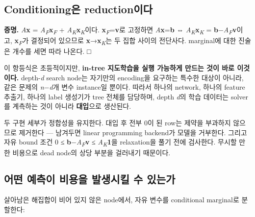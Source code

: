 \documentclass[final,5p,twocolumn]{elsarticle}
\begin{document}
\subsection{Conditioning은 reduction이다}
\noindent{}\par\medskip
\textbf{증명.} \textit{A}\textbf{x} = \textit{A\textsubscript{F}}\textbf{x}\textsubscript{\textit{F}} + \textit{A\textsubscript{K}}\textbf{x}\textsubscript{\textit{K}}이다. \textbf{x}\textsubscript{\textit{F}}=\textbf{v}로 고정하면 \textit{A}\textbf{x}=\textbf{b} ⇔ \textit{A\textsubscript{K}}\textbf{x}\textsubscript{\textit{K}} = \textbf{b}−\textit{A\textsubscript{F}}\textbf{v}이고, \textbf{x}\textsubscript{\textit{F}}가 결정되어 있으므로 \textbf{x}→\textbf{x}\textsubscript{\textit{K}}는 두 집합 사이의 전단사다. marginal에 대한 진술은 개수를 세면 따라 나온다. □

이 항등식은 초등적이지만, \textbf{in-tree 지도학습을 실행 가능하게 만드는 것이 바로 이것이다.} depth-\textit{d} search node는 자기만의 encoding을 요구하는 특수한 대상이 아니라, 같은 문제의 \textit{n}−\textit{d}개 변수 instance일 뿐이다. 따라서 하나의 network, 하나의 feature 추출기, 하나의 label 생성기가 tree 전체를 담당하며, depth \textit{d}의 학습 데이터는 solver를 계측하는 것이 아니라 \textbf{대입}으로 생산된다.

두 구현 세부가 정합성을 유지한다. 대입 후 전부 0이 된 row는 제약을 부과하지 않으므로 제거한다 — 남겨두면 linear programming backend가 모델을 거부한다. 그리고 자유 bound 조건 0 ≤ \textbf{b}−\textit{A\textsubscript{F}}\textbf{v} ≤ \textit{A\textsubscript{K}}\textbf{1}을 relaxation을 풀기 전에 검사한다. 무시할 만한 비용으로 dead node의 상당 부분을 걸러내기 때문이다.

\subsection{어떤 예측이 비용을 발생시킬 수 있는가}
살아남은 해집합이 비어 있지 않은 node에서, 자유 변수를 conditional marginal로 분할한다:
\end{document}

